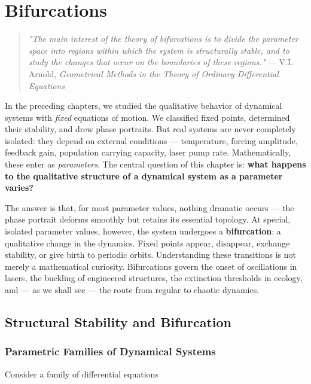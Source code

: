 \chapter{Bifurcations}\label{ch:5}

\begin{quote}
\textit{"The main interest of the theory of bifurcations is to divide the parameter space into regions within which the system is structurally stable, and to study the changes that occur on the boundaries of these regions."}
--- V.I. Arnold, \textit{Geometrical Methods in the Theory of Ordinary Differential Equations}
\end{quote}

In the preceding chapters, we studied the qualitative behavior of dynamical systems with \textit{fixed} equations of motion. We classified fixed points, determined their stability, and drew phase portraits. But real systems are never completely isolated: they depend on external conditions --- temperature, forcing amplitude, feedback gain, population carrying capacity, laser pump rate. Mathematically, these enter as \textit{parameters}. The central question of this chapter is: \textbf{what happens to the qualitative structure of a dynamical system as a parameter varies?}

The answer is that, for most parameter values, nothing dramatic occurs --- the phase portrait deforms smoothly but retains its essential topology. At special, isolated parameter values, however, the system undergoes a \textbf{bifurcation}: a qualitative change in the dynamics. Fixed points appear, disappear, exchange stability, or give birth to periodic orbits. Understanding these transitions is not merely a mathematical curiosity. Bifurcations govern the onset of oscillations in lasers, the buckling of engineered structures, the extinction thresholds in ecology, and --- as we shall see --- the route from regular to chaotic dynamics.


\bigskip


\section{Structural Stability and Bifurcation}\label{sec:5.1}

\subsection{Parametric Families of Dynamical Systems}\label{sec:5.1.1}

Consider a family of differential equations

